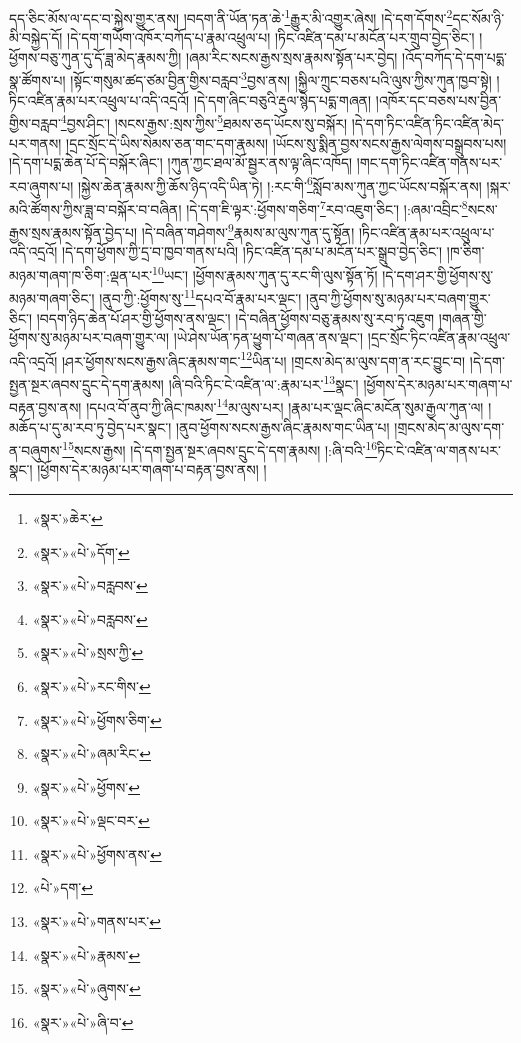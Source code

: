 དད་ཅིང་མོས་ལ་དང་བ་སྐྱེས་གྱུར་ནས། །བདག་ནི་ཡོན་ཏན་ཆེ་\footnote{«སྣར་»ཆེར་}རྒྱུར་མི་འགྱུར་ཞེས། །དེ་དག་དོགས་\footnote{«སྣར་»«པེ་»དོག་}དང་སོམ་ཉི་མི་བསྐྱེད་དོ། །དེ་དག་གཡོག་འཁོར་བཀོད་པ་རྣམ་འཕྲུལ་པ། །ཏིང་འཛིན་དམ་པ་མངོན་པར་གྲུབ་བྱེད་ཅིང་། །ཕྱོགས་བཅུ་ཀུན་དུ་དོ་ཟླ་མེད་རྣམས་ཀྱི། །ཞམ་རིང་སངས་རྒྱས་སྲས་རྣམས་སྟོན་པར་བྱེད། །འོད་བཀོད་དེ་དག་པདྨ་སྣ་ཚོགས་པ། །སྟོང་གསུམ་ཚད་ཙམ་བྱིན་གྱིས་བརླབ་\footnote{«སྣར་»«པེ་»བརླབས་}བྱས་ནས། །སྐྱིལ་ཀྲུང་བཅས་པའི་ལུས་ཀྱིས་ཀུན་ཁྱབ་སྟེ། །ཏིང་འཛིན་རྣམ་པར་འཕྲུལ་པ་འདི་འདྲའོ། །དེ་དག་ཞིང་བཅུའི་རྡུལ་སྙེད་པདྨ་གཞན། །འཁོར་དང་བཅས་པས་བྱིན་གྱིས་བརླབ་\footnote{«སྣར་»«པེ་»བརླབས་}བྱས་ཤིང་། །སངས་རྒྱས་:སྲས་ཀྱིས་\footnote{«སྣར་»«པེ་»སྲས་ཀྱི་}ཐམས་ཅད་ཡོངས་སུ་བསྐོར། །དེ་དག་ཏིང་འཛིན་ཏིང་འཛིན་མེད་པར་གནས། །དྲང་སྲོང་དེ་ཡིས་སེམས་ཅན་གང་དག་རྣམས། །ཡོངས་སུ་སྨིན་བྱས་སངས་རྒྱས་ལེགས་བསྒྲུབས་པས། །དེ་དག་པདྨ་ཆེན་པོ་དེ་བསྐོར་ཞིང་། །ཀུན་ཀྱང་ཐལ་མོ་སྦྱར་ནས་ལྟ་ཞིང་འཁོད། །གང་དག་ཏིང་འཛིན་གནས་པར་རབ་ཞུགས་པ། །སྐྱེས་ཆེན་རྣམས་ཀྱི་ཆོས་ཉིད་འདི་ཡིན་ཏེ། །:རང་གི་\footnote{«སྣར་»«པེ་»རང་གིས་}སློབ་མས་ཀུན་ཀྱང་ཡོངས་བསྐོར་ནས། །སྐར་མའི་ཚོགས་ཀྱིས་ཟླ་བ་བསྐོར་བ་བཞིན། །དེ་དག་ཇི་ལྟར་:ཕྱོགས་གཅིག་\footnote{«སྣར་»«པེ་»ཕྱོགས་ཅིག་}རབ་འཇུག་ཅིང་། །:ཞམ་འབྲིང་\footnote{«སྣར་»«པེ་»ཞམ་རིང་}སངས་རྒྱས་སྲས་རྣམས་སྟོན་བྱེད་པ། །དེ་བཞིན་གཤེགས་\footnote{«སྣར་»«པེ་»ཕྱོགས་}རྣམས་མ་ལུས་ཀུན་དུ་སྟོན། །ཏིང་འཛིན་རྣམ་པར་འཕྲུལ་པ་འདི་འདྲའོ། །དེ་དག་ཕྱོགས་ཀྱི་དྲ་བ་ཁྱབ་གནས་པའི། །ཏིང་འཛིན་དམ་པ་མངོན་པར་སྒྲུབ་བྱེད་ཅིང་། །ཁ་ཅིག་མཉམ་གཞག་ཁ་ཅིག་:ལྡན་པར་\footnote{«སྣར་»«པེ་»ལྡང་བར་}ཡང་། །ཕྱོགས་རྣམས་ཀུན་དུ་རང་གི་ལུས་སྟོན་ཏོ། །དེ་དག་ཤར་གྱི་ཕྱོགས་སུ་མཉམ་གཞག་ཅིང་། །ནུབ་ཀྱི་:ཕྱོགས་སུ་\footnote{«སྣར་»«པེ་»ཕྱོགས་ནས་}དཔའ་བོ་རྣམ་པར་ལྡང་། །ནུབ་ཀྱི་ཕྱོགས་སུ་མཉམ་པར་བཞག་གྱུར་ཅིང་། །བདག་ཉིད་ཆེན་པོ་ཤར་གྱི་ཕྱོགས་ནས་ལྡང་། །དེ་བཞིན་ཕྱོགས་བཅུ་རྣམས་སུ་རབ་ཏུ་འཇུག །གཞན་གྱི་ཕྱོགས་སུ་མཉམ་པར་བཞག་གྱུར་ལ། །ཡེ་ཤེས་ཡོན་ཏན་ཕྱུག་པོ་གཞན་ནས་ལྡང་། །དྲང་སྲོང་ཏིང་འཛིན་རྣམ་འཕྲུལ་འདི་འདྲའོ། །ཤར་ཕྱོགས་སངས་རྒྱས་ཞིང་རྣམས་གང་\footnote{«པེ་»དག་}ཡིན་པ། །གྲངས་མེད་མ་ལུས་དག་ན་རང་བྱུང་བ། །དེ་དག་སྤྱན་སྔར་ཞབས་དྲུང་དེ་དག་རྣམས། །ཞི་བའི་ཏིང་ངེ་འཛིན་ལ་:རྣམ་པར་\footnote{«སྣར་»«པེ་»གནས་པར་}སྣང་། །ཕྱོགས་དེར་མཉམ་པར་གཞག་པ་བརྟན་བྱས་ནས། །དཔའ་བོ་ནུབ་ཀྱི་ཞིང་ཁམས་\footnote{«སྣར་»«པེ་»རྣམས་}མ་ལུས་པར། །རྣམ་པར་ལྡང་ཞིང་མངོན་སུམ་རྒྱལ་ཀུན་ལ། །མཆོད་པ་དུ་མ་རབ་ཏུ་བྱེད་པར་སྣང་། །ནུབ་ཕྱོགས་སངས་རྒྱས་ཞིང་རྣམས་གང་ཡིན་པ། །གྲངས་མེད་མ་ལུས་དག་ན་བཞུགས་\footnote{«སྣར་»«པེ་»ཞུགས་}སངས་རྒྱས། །དེ་དག་སྤྱན་སྔར་ཞབས་དྲུང་དེ་དག་རྣམས། །:ཞི་བའི་\footnote{«སྣར་»«པེ་»ཞི་བ་}ཏིང་ངེ་འཛིན་ལ་གནས་པར་སྣང་། །ཕྱོགས་དེར་མཉམ་པར་གཞག་པ་བརྟན་བྱས་ནས། །
